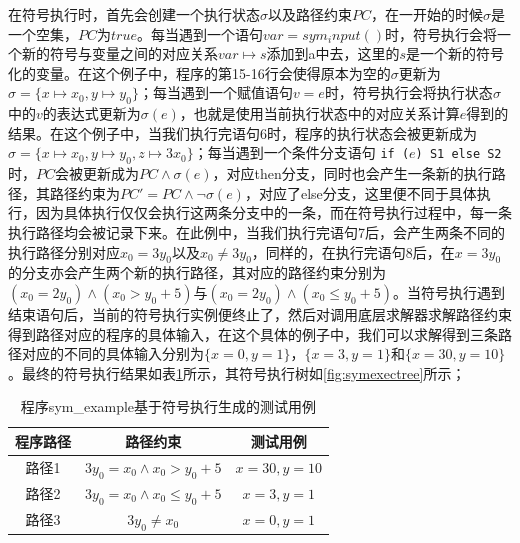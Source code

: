 在符号执行时，首先会创建一个执行状态$\sigma$以及路径约束$PC$，在一开始的时候$\sigma$是一个空集，$PC$为$true$。每当遇到一个语句$var = sym_input()$时，符号执行会将一个新的符号与变量之间的对应关系$var \mapsto s$添加到a中去，这里的$s$是一个新的符号化的变量。在这个例子中，程序的第15-16行会使得原本为空的$\sigma$更新为$\sigma = \{x \mapsto x_0, y \mapsto y_0\}$；每当遇到一个赋值语句$v = e$时，符号执行会将执行状态$\sigma$中的$v$的表达式更新为$\sigma(e)$，也就是使用当前执行状态中的对应关系计算$e$得到的结果。在这个例子中，当我们执行完语句6时，程序的执行状态会被更新成为$\sigma = \{x \mapsto x_0, y \mapsto y_0, z \mapsto 3x_0\}$；每当遇到一个条件分支语句 \texttt{if (}$e$\texttt{) S1 else S2}时，$PC$会被更新成为$PC\wedge\sigma(e)$，对应then分支，同时也会产生一条新的执行路径，其路径约束为$PC'=PC\wedge\neg\sigma(e)$，对应了else分支，这里便不同于具体执行，因为具体执行仅仅会执行这两条分支中的一条，而在符号执行过程中，每一条执行路径均会被记录下来。在此例中，当我们执行完语句7后，会产生两条不同的执行路径分别对应$x_0 = 3y_0$以及$x_0 \neq 3y_0$，同样的，在执行完语句8后，在$x=3y_0$的分支亦会产生两个新的执行路径，其对应的路径约束分别为$(x_0 = 2y_0) \wedge (x_0 > y_0 + 5)$与$(x_0 = 2y_0) \wedge (x_0 \leq y_0 + 5)$。当符号执行遇到结束语句后，当前的符号执行实例便终止了，然后对调用底层求解器求解路径约束得到路径对应的程序的具体输入，在这个具体的例子中，我们可以求解得到三条路径对应的不同的具体输入分别为$\{x = 0,y = 1\}$，$\{x = 3,y = 1\}$和$\{x = 30, y = 10\}$。最终的符号执行结果如表\ref{tbl:symexamres}所示，其符号执行树如\ref{fig:symexectree}所示；

\begin{table}
    \centering
    \begin{tabular}{ccc}
      \toprule
      \textbf{程序路径} & \textbf{路径约束} & \textbf{测试用例} \\
      \midrule
      路径1 & $3y_0 = x_0 \wedge x_0 > y_0 + 5$ & $x = 30, y = 10 $ \\
      路径2 & $3y_0 = x_0 \wedge x_0 \leq y_0 + 5 $ & $x = 3, y = 1$ \\
      路径3 & $3y_0 \neq x_0$ & $x = 0, y = 1$ \\
      \bottomrule
    \end{tabular}
    \caption{程序sym\_example基于符号执行生成的测试用例}\label{tbl:symexamres}
\end{table}


